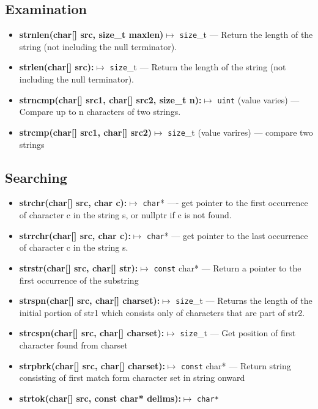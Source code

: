 \documentclass{report}
\begin{document}
    \bigbreak \noindent 
    \subsection{Examination}
    \begin{itemize}
        \item \textbf{strnlen(char[] src, size\_t maxlen)}$\mapsto$ \texttt{size}\_t --- Return the length of the string (not including the null terminator).
        \item \textbf{strlen(char[] src):}$\mapsto$ \texttt{size}\_t --- Return the length of the string (not including the null terminator).
        \item \textbf{strncmp(char[] src1, char[] src2, size\_t n):}$\mapsto$ \texttt{uint} (value varies) --- Compare up to n characters of two strings.
        \item \textbf{strcmp(char[] src1, char[] src2)}$\mapsto$ \texttt{size}\_t (value varires) --- compare two strings
    \end{itemize}

    \bigbreak \noindent 
    \subsection{Searching}
    \begin{itemize}
        \item \textbf{strchr(char[] src, char c):}$\mapsto$ \texttt{char}* ---- get pointer to the first occurrence of character c in the string s, or nullptr if c is not found.
        \item \textbf{strrchr(char[] src, char c):}$\mapsto$ \texttt{char}* --- get pointer to the last occurrence of character c in the string s.
        \item \textbf{strstr(char[] src, char[] str):}$\mapsto$ \texttt{const} char* --- Return a pointer to the first occurrence of the substring 
        \item \textbf{strspn(char[] src, char[] charset):}$\mapsto$ \texttt{size}\_t --- Returns the length of the initial portion of str1 which consists only of characters that are part of str2.
        \item \textbf{strcspn(char[] src, char[] charset):}$\mapsto$ \texttt{size}\_t --- Get position of first character found from charset 
        \item \textbf{strpbrk(char[] src, char[] charset):}$\mapsto$ \texttt{const} char* --- Return string consisting of first match form character set in string onward
        \item \textbf{strtok(char[] src, const char* delims):}$\mapsto$ \texttt{char*}
    \end{itemize}
\end{document}
